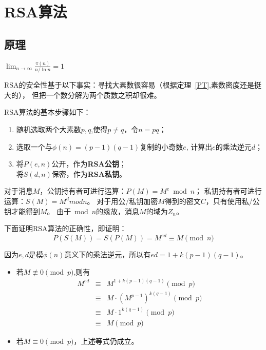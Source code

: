 \section{RSA算法}
\subsection{原理}
\begin{theorem}[素数定理]\label{PT}
    $\lim_{n\rightarrow\infty}\frac{\pi(n)}{n/\ln n}=1$
\end{theorem}
RSA的安全性基于以下事实：寻找大素数很容易（根据定理~\ref{PT},素数密度还是挺大的），
但把一个数分解为两个质数之积却很难。

RSA算法的基本步骤如下：
\begin{enumerate}
    \item 随机选取两个大素数$p,q$,使得$p\neq q$，令$n=pq$；
    \item 选取一个与$\phi(n)=(p-1)(q-1)$复制的小奇数$e$,
    计算出$e$的乘法逆元$d$；
    \item 将$P(e,n)$公开，作为{\bfseries RSA公钥}；\\
          将$S(d,n)$保密，作为{\bfseries RSA私钥}。
\end{enumerate}

对于消息$M$，公钥持有者可进行运算：$P(M)=M^e \bmod n$；
私钥持有者可进行运算：$S(M)=M^d mod n$。
对于用公/私钥加密$M$得到的密文$C$，只有使用私/公钥才能得到$M$。
由于$\bmod n$的缘故，消息$M$的域为$Z_n$。

下面证明RSA算法的正确性，即证明：
\begin{displaymath}
    P(S(M))=S(P(M))=M^{ed}\equiv M \pmod{n}
\end{displaymath}

因为$e,d$是模$\phi(n)$意义下的乘法逆元，所以有$ed=1+k(p-1)(q-1)$。

\begin{itemize}
    \item 若$M\not\equiv 0 \pmod{p}$,则有
    \begin{eqnarray*}
        M^{ed}&\equiv& M^{1+k(p-1)(q-1)} \pmod{p}\\
        &\equiv& M\cdot (M^{p-1})^{k(q-1)} \pmod{p}\\
        &\equiv& M\cdot 1^{k(q-1)} \pmod{p}\\
        &\equiv& M \pmod{p}
    \end{eqnarray*}
    \item 若$M\equiv 0 \pmod{p}$，上述等式仍成立。
\end{itemize}

